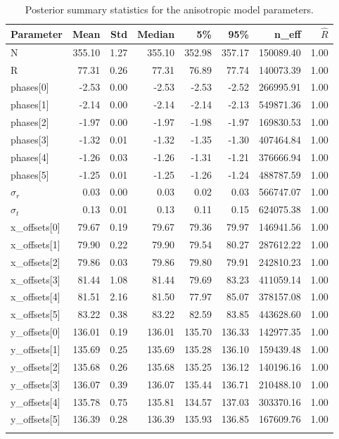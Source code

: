 \documentclass[a4paper,12pt]{article}
\begin{document}
\begin{longtable}{lrrrrrrr}
    \toprule
    \textbf{Parameter} & \textbf{Mean} & \textbf{Std} & \textbf{Median} & \textbf{5\%} & \textbf{95\%} & \textbf{n\_eff} & \textbf{$\hat{R}$} \\
    \midrule
    N              & 355.10 & 1.27 & 355.10 & 352.98 & 357.17 & 150089.40 & 1.00 \\
    R              & 77.31 & 0.26 & 77.31 & 76.89 & 77.74 & 140073.39 & 1.00 \\
    phases[0]      & -2.53 & 0.00 & -2.53 & -2.53 & -2.52 & 266995.91 & 1.00 \\
    phases[1]      & -2.14 & 0.00 & -2.14 & -2.14 & -2.13 & 549871.36 & 1.00 \\
    phases[2]      & -1.97 & 0.00 & -1.97 & -1.98 & -1.97 & 169830.53 & 1.00 \\
    phases[3]      & -1.32 & 0.01 & -1.32 & -1.35 & -1.30 & 407464.84 & 1.00 \\
    phases[4]      & -1.26 & 0.03 & -1.26 & -1.31 & -1.21 & 376666.94 & 1.00 \\
    phases[5]      & -1.25 & 0.01 & -1.25 & -1.26 & -1.24 & 488787.59 & 1.00 \\
    $\sigma_r$     & 0.03 & 0.00 & 0.03 & 0.02 & 0.03 & 566747.07 & 1.00 \\
    $\sigma_t$     & 0.13 & 0.01 & 0.13 & 0.11 & 0.15 & 624075.38 & 1.00 \\
    x\_offsets[0]  & 79.67 & 0.19 & 79.67 & 79.36 & 79.97 & 146941.56 & 1.00 \\
    x\_offsets[1]  & 79.90 & 0.22 & 79.90 & 79.54 & 80.27 & 287612.22 & 1.00 \\
    x\_offsets[2]  & 79.86 & 0.03 & 79.86 & 79.80 & 79.91 & 242810.23 & 1.00 \\
    x\_offsets[3]  & 81.44 & 1.08 & 81.44 & 79.69 & 83.23 & 411059.14 & 1.00 \\
    x\_offsets[4]  & 81.51 & 2.16 & 81.50 & 77.97 & 85.07 & 378157.08 & 1.00 \\
    x\_offsets[5]  & 83.22 & 0.38 & 83.22 & 82.59 & 83.85 & 443628.60 & 1.00 \\
    y\_offsets[0]  & 136.01 & 0.19 & 136.01 & 135.70 & 136.33 & 142977.35 & 1.00 \\
    y\_offsets[1]  & 135.69 & 0.25 & 135.69 & 135.28 & 136.10 & 159439.48 & 1.00 \\
    y\_offsets[2]  & 135.68 & 0.26 & 135.68 & 135.25 & 136.12 & 140196.16 & 1.00 \\
    y\_offsets[3]  & 136.07 & 0.39 & 136.07 & 135.44 & 136.71 & 210488.10 & 1.00 \\
    y\_offsets[4]  & 135.78 & 0.75 & 135.81 & 134.57 & 137.03 & 303370.16 & 1.00 \\
    y\_offsets[5]  & 136.39 & 0.28 & 136.39 & 135.93 & 136.85 & 167609.76 & 1.00 \\
    \caption{Posterior summary statistics for the anisotropic model parameters.}
    \label{tab:posterior_summary_aniso}
    \end{longtable}
\end{document}
